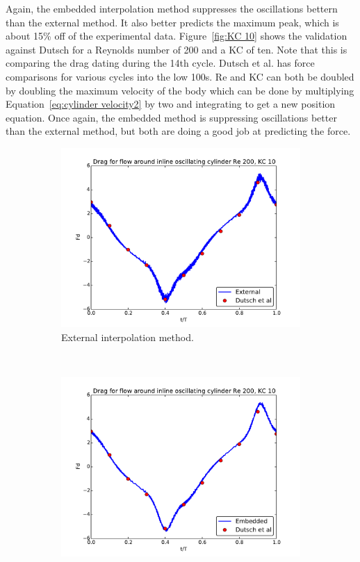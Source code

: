 Again, the embedded interpolation method suppresses the oscillations bettern than the external method. It also better predicts the maximum peak, which is about 15\% off of the experimental data.
Figure~\ref{fig:KC 10} shows the validation against Dutsch for a Reynolds number of 200 and a KC of ten. 
Note that this is comparing the drag dating during the 14th cycle. 
Dutsch et al. has force comparisons for various cycles into the low 100s.
Re and KC can both be doubled by doubling the maximum velocity of the body which can be done by multiplying Equation~\eqref{eq:cylinder velocity2} by two and integrating to get a new position equation.
Once again, the embedded method is suppressing oscillations better than the external method, but both are doing a good job at predicting the force. 
\begin{figure}[!htb]
	\centering
	\begin{subfigure}{0.4\textwidth}
		\includegraphics[width=\linewidth]{External_static_kc10}
		\caption{External interpolation method.}
	\end{subfigure}
	~
	\begin{subfigure}{0.4\textwidth}
		\includegraphics[width=\linewidth]{Embedded_static_kc10}

\end{subfigure}
\end{figure}

